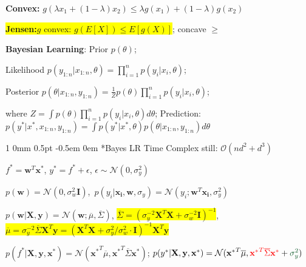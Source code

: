 \documentclass[11pt,landscape,a4paper,fleqn]{article}
\makeatletter
\newcommand*{\rsection}{%
	\@startsection{section}%
	{1}%
	{0mm}%
	{0.5pt}%
	{-0.5em \@plus 0em}
	{\color{myorange}\sffamily\small\bfseries}}
\newcommand{\mhl}[1]{\setlength{\fboxsep}{0pt}\colorbox{yellow}{#1}}
\makeatother
\begin{document}
\begin{multicols*}{4}

\textbf{Convex:}
$g(\lambda x_1 + (1-\lambda) x_2) \leq \lambda g(x_1) + (1-\lambda) g(x_2)$

\mhl{\textbf{Jensen:}$g$ convex: $g(E[X]) \leq E[g(X)]$}; concave $\geq$

\textbf{Bayesian Learning}:
Prior $p(\theta)$;

Likelihood $p(y_{1:n} | x_{1:n}, \theta) = \prod_{i=1}^{n} p(y_i | x_i, \theta)$;

Posterior $p(\theta | x_{1:n}, y_{1:n}) = \frac{1}{Z} p(\theta) \prod_{i=1}^{n} p(y_i | x_i, \theta)$;

where $Z = \int p(\theta) \prod_{i=1}^{n} p(y_i | x_i, \theta) d\theta$;
Prediction: $p(y^* | x^*, x_{1:n}, y_{1:n}) = \int p(y^* | x^*, \theta) p(\theta | x_{1:n}, y_{1:n}) d\theta$

\rsection*{Bayes LR} Time Complex still: $\mathcal{O}(nd^2+d^3)$ 

$f^* = \mathbf{w}^T\mathbf{x}^*$, $y^* = f^* + \epsilon$, $\epsilon \sim \mathcal{N}(0, \sigma_y^2)$

\vspace*{-0.5mm}
\mbox{\fontsize{9.8}{6}\selectfont $p(\mathbf{w}) = \mathcal{N}(0, \sigma_w^2 \mathbf{I})$, $p(y_i|\mathbf{x_i}, \mathbf{w}, \sigma_y) = \mathcal{N}(y_i; \mathbf{w}^T\mathbf{x_i}, \sigma_y^2)$}

\vspace*{-0.5mm}
$p(\mathbf{w} | \mathbf{X, y}) = \mathcal{N}(\mathbf{w}; \overline{\mu}, \overline{\Sigma})$,
\mhl{$\overline{\Sigma} = (\sigma_y^{-2}\mathbf{X}^T\mathbf{X} + \sigma_w^{-2} \mathbf{I})^{-1}$},
\mhl{$\overline{\mu} = \sigma_y^{-2} \overline{\Sigma} \mathbf{X}^T\mathbf{y}= (\mathbf{X}^T\mathbf{X} + \sigma_y^{2}/\sigma_w^{2}\cdot \mathbf{I})^{-1} \mathbf{X}^T\mathbf{y}$}

$p(f^* | \mathbf{X,y,x^*}) = \mathcal{N}(\mathbf{x^*}^T\overline{\mu}, {\mathbf{x}^*}^T \overline{\Sigma} \mathbf{x}^*)$;
$p(y^* | \mathbf{X,y,x^*}) = \mathcal{N}({\mathbf{x}^*}^T \overline{\mu}, \textcolor{red}{{\mathbf{x}^*}^T \overline{\Sigma} \mathbf{x}^*} + \textcolor{darkgreen}{\sigma_y^2})$


\end{multicols*}
\end{document}
